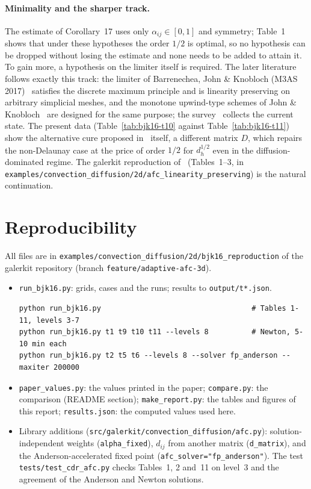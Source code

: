\documentclass[11pt]{article}
\begin{document}
\paragraph{Minimality and the sharper track.} The estimate of Corollary~17 uses only $\alpha_{ij}\in[0,1]$ and
symmetry; Table~1 shows that under these hypotheses the order $1/2$ is optimal, so no hypothesis can be dropped
without losing the estimate and none needs to be added to attain it. To gain more, a hypothesis on the limiter
itself is required. The later literature follows exactly this track: the limiter of Barrenechea, John \& Knobloch
(M3AS 2017)~\cite{BJK17} satisfies the discrete maximum principle and is linearity preserving on arbitrary
simplicial meshes, and the monotone upwind-type schemes of John \& Knobloch~\cite{JK22} are designed
for the same purpose; the survey~\cite{BJK24} collects the current state. The present data (Table~\ref{tab:bjk16-t10}
against Table~\ref{tab:bjk16-t11}) show the alternative cure proposed in~\cite{BJK16} itself, a different matrix $D$,
which repairs the non-Delaunay case at the price of order $1/2$ for $d_h^{1/2}$ even in the diffusion-dominated regime.
The galerkit reproduction of~\cite{BJK17} (Tables~1--3, in \texttt{examples/convection\_diffusion/2d/afc\_linearity\_preserving})
is the natural continuation.

\section{Reproducibility}

All files are in \texttt{examples/convection\_diffusion/2d/bjk16\_reproduction} of the galerkit repository (branch
\texttt{feature/adaptive-afc-3d}).
\begin{itemize}[leftmargin=*]
\item \texttt{run\_bjk16.py}: grids, cases and the runs; results to \texttt{output/t*.json}.
\begin{verbatim}
python run_bjk16.py                                   # Tables 1-11, levels 3-7
python run_bjk16.py t1 t9 t10 t11 --levels 8          # Newton, 5-10 min each
python run_bjk16.py t2 t5 t6 --levels 8 --solver fp_anderson --maxiter 200000
\end{verbatim}
\item \texttt{paper\_values.py}: the values printed in the paper; \texttt{compare.py}: the comparison
  (README section); \texttt{make\_report.py}: the tables and figures of this report;
  \texttt{results.json}: the computed values used here.
\item Library additions (\texttt{src/galerkit/convection\_diffusion/afc.py}): solution-independent weights
  (\texttt{alpha\_fixed}), $d_{ij}$ from another matrix (\texttt{d\_matrix}), and the Anderson-accelerated fixed
  point (\texttt{afc\_solver="fp\_anderson"}). The test \texttt{tests/test\_cdr\_afc.py} checks Tables~1, 2 and~11 on
  level~3 and the agreement of the Anderson and Newton solutions.
\end{itemize}
\end{document}
